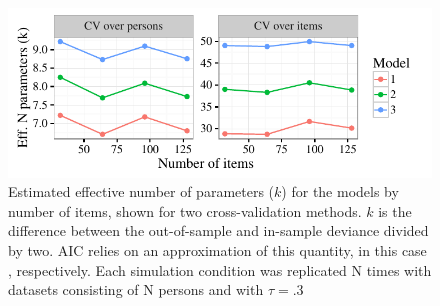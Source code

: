 \documentclass[12pt, letterpaper]{article}
\begin{document}
\begin{figure}[tbp]
	\centering
	\includegraphics{chapter_2/figs/k_overnitems.pdf}
	\caption{Estimated effective number of parameters ($k$) for the models by number of items, shown for two cross-validation methods. $k$ is the difference between the out-of-sample and in-sample deviance divided by two. AIC relies on an approximation of this quantity, in this case \aic[and], respectively. Each simulation condition was replicated N times with datasets consisting of N persons and with $\tau = .3$}
	\label{fig:k-overnitems}
\end{figure}

%

%
%
\end{document}

